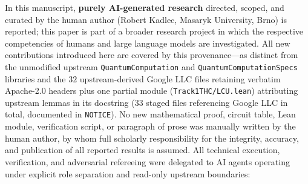 \documentclass[11pt,a4paper]{article}
\theoremstyle{definition}
\theoremstyle{remark}
\begin{document}
In this manuscript, \textbf{purely AI-generated research} directed, scoped, and curated by the human author (Robert Kadlec, Masaryk University, Brno) is reported; this paper is part of a broader research project in which the respective competencies of humans and large language models are investigated. All new contributions introduced here are covered by this provenance---as distinct from the unmodified upstream \texttt{Quantum\allowbreak Computation} and \texttt{Quantum\allowbreak Computation\allowbreak Specs} libraries and the \(32\) upstream-derived Google LLC files retaining verbatim Apache-2.0 headers plus one partial module (\texttt{Track1THC/LCU.lean}) attributing upstream lemmas in its docstring (\(33\) staged files referencing Google LLC in total, documented in \texttt{NOTICE}). No new mathematical proof, circuit table, Lean module, verification script, or paragraph of prose was manually written by the human author, by whom full scholarly responsibility for the integrity, accuracy, and publication of all reported results is assumed. All technical execution, verification, and adversarial refereeing were delegated to AI agents operating under explicit role separation and read-only upstream boundaries:
\end{document}
